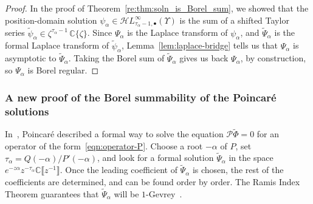 \documentclass{article}
\newcommand{\singexp}[2]{\mathcal{H}L^\infty_{#1, #2}}
\newcommand{\singexpalg}[1]{\singexp{#1}{\bullet}}
\newcommand{\C}{\mathbb{C}}
\newcommand{\series}[1]{\tilde{#1}}
\theoremstyle{definition}
\theoremstyle{plain}
\begin{document}
\begin{proof}
In the proof of Theorem~\ref{re:thm:soln_is_Borel_sum}, we showed that the position-domain solution $\psi_\alpha \in \singexpalg{\tau_\alpha-1}(\Upsilon)$ is the sum of a shifted Taylor series $\series{\psi}_\alpha \in \zeta^{\tau_\alpha-1}\,\C\{\zeta\}$. Since $\Psi_\alpha$ is the Laplace transform of $\psi_\alpha$, and $\series{\Psi}_\alpha$ is the formal Laplace transform of $\series{\psi}_\alpha$, Lemma~\ref{lem:laplace-bridge} tells us that $\Psi_\alpha$ is asymptotic to $\series{\Psi}_\alpha$. Taking the Borel sum of $\series{\Psi}_\alpha$ gives us back $\Psi_\alpha$, by construction, so $\Psi_\alpha$ is Borel regular.
\end{proof}
%
\subsubsection{A new proof of the Borel summability of the Poincar\'{e} solutions}\label{sec:new-summability-proof}
%
In~\cite{int-irreg}, Poincar\'{e} described a formal way to solve the equation $\mathcal{P}\series{\Phi} = 0$ for an operator of the form~\eqref{eqn:operator-P}. Choose a root $-\alpha$ of $P$, set $\tau_\alpha = Q(-\alpha)/P'(-\alpha)$, and look for a formal solution $\series{\Psi}_\alpha$ in the space $e^{-z\alpha} z^{-\tau_\alpha}\C\llbracket z^{-1} \rrbracket$. Once the leading coefficient of $\series{\Psi}_\alpha$ is chosen, the rest of the coefficients are determined, and can be found order by order. The Ramis Index Theorem guarantees that $\series{\Psi}_\alpha$ will be $1$-Gevrey~\cite{ramis_index}.
\end{document}
